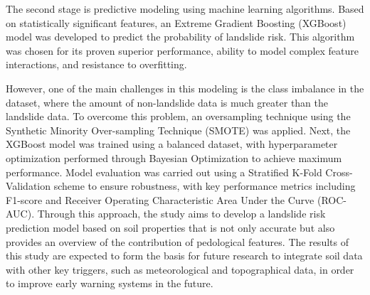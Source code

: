 The second stage is predictive modeling using machine learning algorithms. 
Based on statistically significant features, an Extreme Gradient Boosting (XGBoost) model was developed to predict the probability of landslide risk. This algorithm was chosen for its proven superior performance, ability to model complex feature interactions, and resistance to overfitting.

However, one of the main challenges in this modeling is the class imbalance in the dataset, where the amount of non-landslide data is much greater than the landslide data. To overcome this problem, an oversampling technique using the Synthetic Minority Over-sampling Technique (SMOTE) was applied. 
Next, the XGBoost model was trained using a balanced dataset, with hyperparameter optimization performed through Bayesian Optimization to achieve maximum performance. Model evaluation was carried out using a Stratified K-Fold Cross-Validation scheme to ensure robustness, with key performance metrics including F1-score and Receiver Operating Characteristic Area Under the Curve (ROC-AUC).
Through this approach, the study aims to develop a landslide risk prediction model based on soil properties that is not only accurate but also provides an overview of the contribution of pedological features. The results of this study are expected to form the basis for future research to integrate soil data with other key triggers, such as meteorological and topographical data, in order to improve early warning systems in the future.
